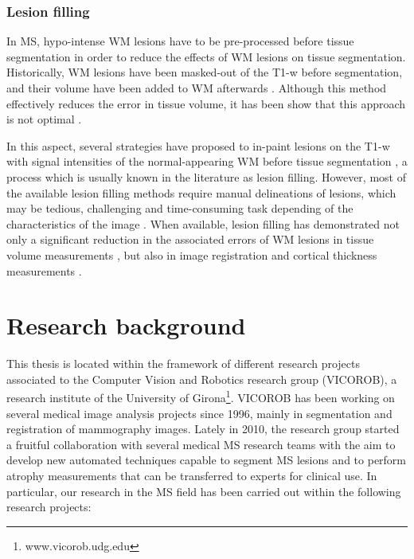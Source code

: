 \subsubsection{Lesion filling}

In MS, hypo-intense WM lesions have to be pre-processed before tissue segmentation in order to reduce the effects of WM lesions on tissue segmentation. Historically, WM lesions have been masked-out of the T1-w before segmentation, and their volume have been added to WM afterwards \cite{Chard2002}. Although this method effectively reduces the error in tissue volume, it has been show that this approach is not optimal \cite{Battaglini2012, Chard2010}. 

In this aspect, several strategies have proposed to in-paint lesions on the T1-w with signal intensities of the normal-appearing WM before tissue segmentation \cite{Battaglini2012, Chard2010, Magon2014, Sdika2009}, a process which is usually known in the literature as lesion filling. However, most of the available lesion filling methods require manual delineations of lesions, which may be tedious, challenging and time-consuming task depending of the characteristics of the image \cite{Llado2012}. When available, lesion filling has demonstrated not only a significant reduction in the associated errors of WM lesions in tissue volume measurements \cite{Popescu2014}, but also in image registration \cite{Ceccarelli2012,  Diez2014, Sdika2009} and cortical thickness measurements \cite{Magon2014}. 

\section{Research background}
\label{sec:research_background}

This thesis is located within the framework of different research projects associated to the Computer Vision and Robotics research group (VICOROB), a research institute of the University of Girona\footnote{www.vicorob.udg.edu}. VICOROB has been working on several medical image analysis projects since 1996, mainly in segmentation and registration of mammography images. Lately in 2010, the research group started a fruitful collaboration with several medical MS research teams with the aim to develop new automated techniques capable to segment MS lesions and to perform atrophy measurements that can be transferred to experts for clinical use. In particular, our research in the MS field has been carried out within the following research projects:

